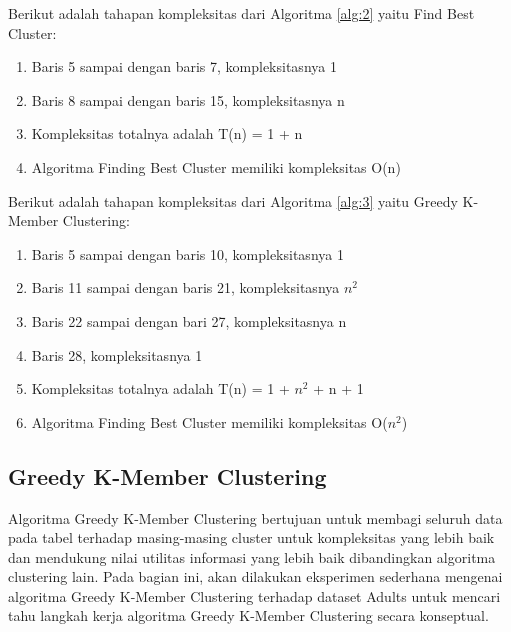 \noindent Berikut adalah tahapan kompleksitas dari Algoritma \ref{alg:2} yaitu Find Best Cluster:

\begin{enumerate}
\item Baris 5 sampai dengan baris 7, kompleksitasnya 1
\item Baris 8 sampai dengan baris 15, kompleksitasnya n 
\item Kompleksitas totalnya adalah T(n) = 1 + n
\item Algoritma Finding Best Cluster memiliki kompleksitas O(n)
\end{enumerate}

\newpage
\noindent Berikut adalah tahapan kompleksitas dari Algoritma \ref{alg:3} yaitu Greedy K-Member Clustering:

\begin{enumerate}
\item Baris 5 sampai dengan baris 10, kompleksitasnya 1
\item Baris 11 sampai dengan baris 21, kompleksitasnya $n^2$
\item Baris 22 sampai dengan bari 27, kompleksitasnya n
\item Baris 28, kompleksitasnya 1
\item Kompleksitas totalnya adalah T(n) = 1 + $n^2$ + n + 1
\item Algoritma Finding Best Cluster memiliki kompleksitas O($n^2$)
\end{enumerate}

\subsection{Greedy K-Member Clustering}
Algoritma Greedy K-Member Clustering bertujuan untuk membagi seluruh data pada tabel terhadap masing-masing cluster untuk kompleksitas yang lebih baik dan mendukung nilai utilitas informasi yang lebih baik dibandingkan algoritma clustering lain. Pada bagian ini, akan dilakukan eksperimen sederhana mengenai algoritma Greedy K-Member Clustering terhadap dataset Adults untuk mencari tahu langkah kerja algoritma Greedy K-Member Clustering secara konseptual. \\

